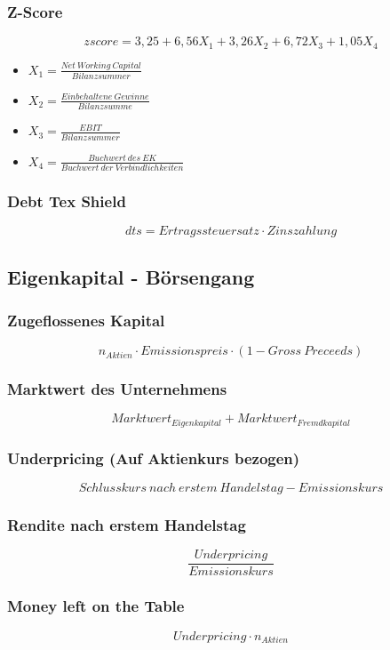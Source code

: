 \subsubsection{Z-Score}
\[zscore = 3,25 + 6,56X_1 + 3,26X_2 + 6,72X_3 + 1,05X_4\]
\begin{itemize}
	\item \(X_1 = \frac{Net~Working~Capital}{Bilanzsummer}\)
	\item \(X_2 = \frac{Einbehaltene~Gewinne}{Bilanzsumme}\)
	\item \(X_3 = \frac{EBIT}{Bilanzsummer}\)
	\item \(X_4 = \frac{Buchwert~des~EK}{Buchwert~der~Verbindlichkeiten}\)
\end{itemize}

\subsubsection{Debt Tex Shield}
\[dts = Ertragssteuersatz \cdot Zinszahlung\]


\subsection{Eigenkapital - Börsengang}

\subsubsection{Zugeflossenes Kapital}
\[n_{Aktien} \cdot Emissionspreis \cdot (1- Gross~Preceeds)\]

\subsubsection{Marktwert des Unternehmens}
\[Marktwert_{Eigenkapital} + Marktwert_{Fremdkapital}\]

\subsubsection{Underpricing (Auf Aktienkurs bezogen)}
\[Schlusskurs~nach~erstem~Handelstag - Emissionskurs\]

\subsubsection{Rendite nach erstem Handelstag}
\[\frac{Underpricing}{Emissionskurs}\]

\subsubsection{Money left on the Table}
\[Underpricing \cdot n_{Aktien}\]

